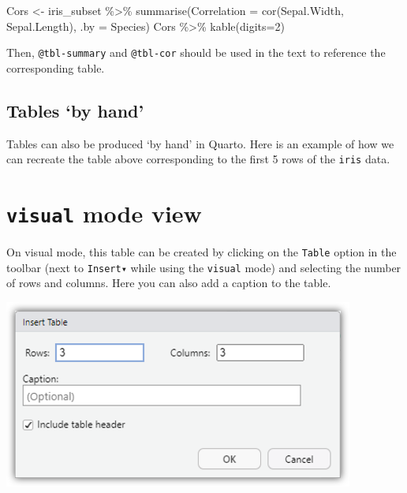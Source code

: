\documentclass[
  letterpaper,
  DIV=11,
  numbers=noendperiod]{scrartcl}
\newenvironment{Shaded}{\begin{snugshade}}{\end{snugshade}}
\newcommand{\AttributeTok}[1]{\textcolor[rgb]{0.40,0.45,0.13}{#1}}
\newcommand{\DecValTok}[1]{\textcolor[rgb]{0.68,0.00,0.00}{#1}}
\newcommand{\FunctionTok}[1]{\textcolor[rgb]{0.28,0.35,0.67}{#1}}
\newcommand{\NormalTok}[1]{\textcolor[rgb]{0.00,0.23,0.31}{#1}}
\newcommand{\OtherTok}[1]{\textcolor[rgb]{0.00,0.23,0.31}{#1}}
\newcommand{\SpecialCharTok}[1]{\textcolor[rgb]{0.37,0.37,0.37}{#1}}
\newcommand{\StringTok}[1]{\textcolor[rgb]{0.13,0.47,0.30}{#1}}
\begin{document}
\begin{tcolorbox}
\begin{Shaded}
\begin{Highlighting}[]
\NormalTok{Cors }\OtherTok{\textless{}{-}}\NormalTok{ iris\_subset }\SpecialCharTok{\%\textgreater{}\%}
        \FunctionTok{summarise}\NormalTok{(}\StringTok{\textquotesingle{}Correlation\textquotesingle{}} \OtherTok{=} \FunctionTok{cor}\NormalTok{(Sepal.Width, Sepal.Length),}
                  \AttributeTok{.by =}\NormalTok{ Species)}
\NormalTok{Cors }\SpecialCharTok{\%\textgreater{}\%}
  \FunctionTok{kable}\NormalTok{(}\AttributeTok{digits=}\DecValTok{2}\NormalTok{)}
\end{Highlighting}
\end{Shaded}

Then, \texttt{@tbl-summary} and \texttt{@tbl-cor} should be used in the
text to reference the corresponding table.

\end{tcolorbox}

\subsection{Tables `by hand'}\label{tables-by-hand}

Tables can also be produced `by hand' in Quarto. Here is an example of
how we can recreate the table above corresponding to the first 5 rows of
the \texttt{iris} data.

\section{\texorpdfstring{\texttt{visual} mode view}{visual mode view}}

On visual mode, this table can be created by clicking on the
\texttt{Table} option in the toolbar (next to \texttt{Insert▾} while
using the \texttt{visual} mode) and selecting the number of rows and
columns. Here you can also add a caption to the table.

\begin{center}
\includegraphics[width=4.53125in,height=\textheight]{images/quarto7.png}
\end{center}
\end{document}

